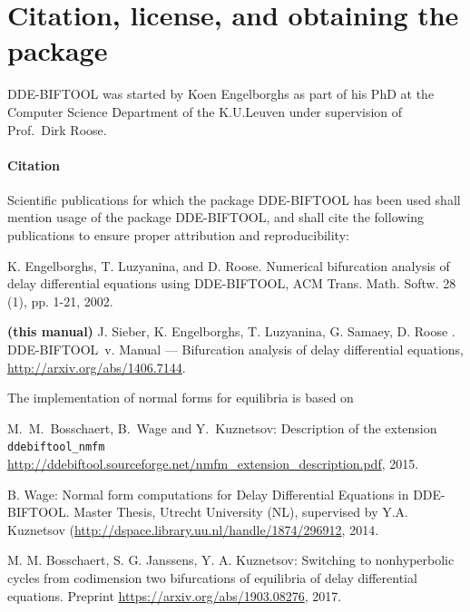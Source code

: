 \documentclass[10pt]{scrartcl}
\newcommand{\DDEBIFCODE}{\textsc{DDE-BIFTOOL}}
\newcommand{\ddebifarx}{\url{http://arxiv.org/abs/1406.7144}}
\begin{document}

%
%
\renewcommand{\contentsname}{}
\tableofcontents
\clearpage
{}
\section{Citation, license, and obtaining the package}
\label{sec:app:get}
{\DDEBIFCODE} %
was started by Koen Engelborghs as part of his PhD at
the Computer Science Department of the K.U.Leuven under supervision
of Prof.\ Dirk Roose.

\paragraph{Citation}
Scientific publications for which the package DDE-BIFTOOL has been
used shall mention usage of the package DDE-BIFTOOL, and shall cite
the following publications to ensure proper attribution and
reproducibility:
\begin{compactitem}\item 
  K. Engelborghs, T. Luzyanina, and D. Roose. Numerical bifurcation
  analysis of delay differential equations using DDE-BIFTOOL, ACM
  Trans. Math. Softw. 28 (1), pp. 1-21, 2002.
\item\textbf{(this manual)} J. Sieber, K. Engelborghs, T. Luzyanina,
  G. Samaey, D. Roose . \DDEBIFCODE\ v. \version{} Manual ---
  Bifurcation analysis
          of delay differential equations, \ddebifarx{}.
\end{compactitem}
The implementation of normal forms for equilibria is based on
\begin{compactitem}
\item M.~M.~Bosschaert, B.~Wage and Y.~Kuznetsov: Description of the
  extension \texttt{ddebiftool\_nmfm}
  \url{http://ddebiftool.sourceforge.net/nmfm_extension_description.pdf}, 2015.
\item B. Wage: Normal form computations for Delay Differential
  Equations in DDE-BIFTOOL. Master Thesis, Utrecht University (NL),
  supervised by Y.A. Kuznetsov (\url{http://dspace.library.uu.nl/handle/1874/296912}, 2014.
\item M. M. Bosschaert, S. G. Janssens, Y. A. Kuznetsov: Switching to
  nonhyperbolic cycles from codimension two bifurcations of equilibria
  of delay differential equations. Preprint \url{https://arxiv.org/abs/1903.08276}, 2017.
\end{compactitem}
\end{document}
